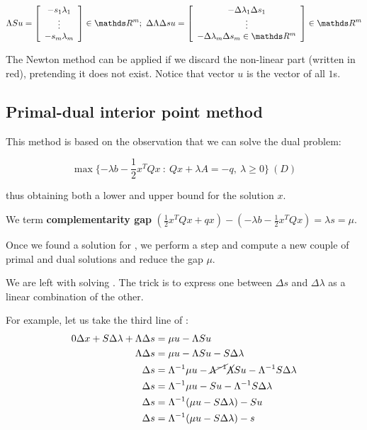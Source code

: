 \documentclass[ComputationalMathematics.tex]{subfiles}
\begin{document}
\[
  \Lambda S u = \left[\begin{array}{c}
  - s_1 {\lambda}_1\\
\vdots\\
  - s_m {\lambda}_m\\
\end{array}\right] \in \R^m;~
\Delta \Lambda \Delta s u = \left[\begin{array}{c}
  - {\Delta \lambda}_1 {\Delta s}_1\\
\vdots\\
  - {\Delta \lambda}_m {\Delta s}_m \in \R^m\\
\end{array}\right] \in \R^m
\]

The Newton method can be applied if we discard the non-linear part (written in red), pretending it does not exist. Notice that vector $u$ is the vector of all $1$s.

\subsection{Primal-dual interior point method}
This method is based on the observation that we can solve the dual problem:

\[
 \max \{- \lambda b - \frac{1}{2} x^T Q x~:~Q x + \lambda A  = - q,~\lambda \geq 0\}~(D)
\]

thus obtaining both a lower and upper bound for the solution $x$.

We term \textbf{complementarity gap} $(\frac{1}{2} x^T Q x + q x) - ( - \lambda b - \frac{1}{2} x^T Q x) = \lambda s = \mu$.

Once we found a solution for , we perform a step and compute a new couple of primal and dual solutions and reduce the gap $\mu$.

We are left with solving . The trick is to express one between $\Delta s$ and $\Delta \lambda$ as a linear combination of the other.

For example, let us take the third line of :
\begin{equation}\label{eq:14dic2}
  \begin{split}
    0 \Delta x + S \Delta \lambda + \Lambda \Delta s &= \mu u -\Lambda S u\\
    \Lambda \Delta s &= \mu u -\Lambda S u - S \Delta \lambda\\
    \Delta s &= {\Lambda}^{-1}\mu u -\cancel{{\Lambda}^{-1}}\cancel{\Lambda} S u - {\Lambda}^{-1}S \Delta \lambda\\
    \Delta s &= {\Lambda}^{-1}\mu u -S u - {\Lambda}^{-1}S \Delta \lambda\\
    \Delta s &= {\Lambda}^{-1} (\mu u - S \Delta \lambda) - Su\\
    \Delta s &= {\Lambda}^{-1} (\mu u - S \Delta \lambda) - s\\
  \end{split}
\end{equation}
\end{document}
